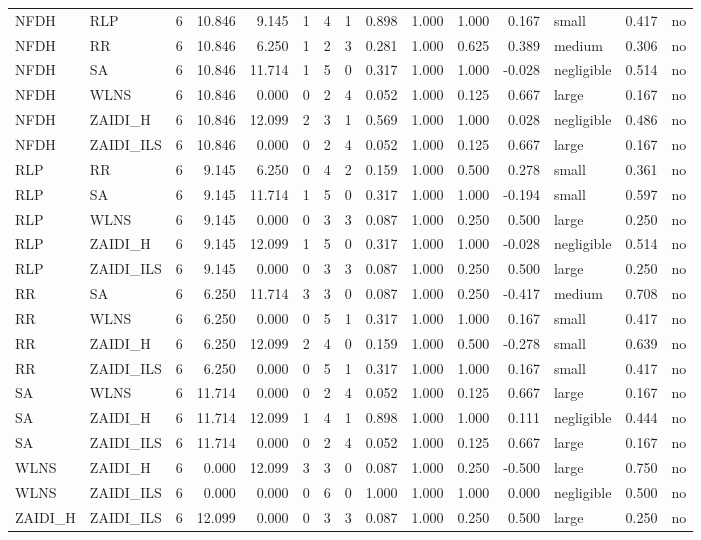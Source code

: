 \begin{table}[htbp]
\begin{tabular}{llrrrrrrrrrrlrr}
NFDH & RLP & 6 & 10.846 & 9.145 & 1 & 4 & 1 & 0.898 & 1.000 & 1.000 & 0.167 & small & 0.417 & no \\
NFDH & RR & 6 & 10.846 & 6.250 & 1 & 2 & 3 & 0.281 & 1.000 & 0.625 & 0.389 & medium & 0.306 & no \\
NFDH & SA & 6 & 10.846 & 11.714 & 1 & 5 & 0 & 0.317 & 1.000 & 1.000 & -0.028 & negligible & 0.514 & no \\
NFDH & WLNS & 6 & 10.846 & 0.000 & 0 & 2 & 4 & 0.052 & 1.000 & 0.125 & 0.667 & large & 0.167 & no \\
NFDH & ZAIDI\_H & 6 & 10.846 & 12.099 & 2 & 3 & 1 & 0.569 & 1.000 & 1.000 & 0.028 & negligible & 0.486 & no \\
NFDH & ZAIDI\_ILS & 6 & 10.846 & 0.000 & 0 & 2 & 4 & 0.052 & 1.000 & 0.125 & 0.667 & large & 0.167 & no \\
RLP & RR & 6 & 9.145 & 6.250 & 0 & 4 & 2 & 0.159 & 1.000 & 0.500 & 0.278 & small & 0.361 & no \\
RLP & SA & 6 & 9.145 & 11.714 & 1 & 5 & 0 & 0.317 & 1.000 & 1.000 & -0.194 & small & 0.597 & no \\
RLP & WLNS & 6 & 9.145 & 0.000 & 0 & 3 & 3 & 0.087 & 1.000 & 0.250 & 0.500 & large & 0.250 & no \\
RLP & ZAIDI\_H & 6 & 9.145 & 12.099 & 1 & 5 & 0 & 0.317 & 1.000 & 1.000 & -0.028 & negligible & 0.514 & no \\
RLP & ZAIDI\_ILS & 6 & 9.145 & 0.000 & 0 & 3 & 3 & 0.087 & 1.000 & 0.250 & 0.500 & large & 0.250 & no \\
RR & SA & 6 & 6.250 & 11.714 & 3 & 3 & 0 & 0.087 & 1.000 & 0.250 & -0.417 & medium & 0.708 & no \\
RR & WLNS & 6 & 6.250 & 0.000 & 0 & 5 & 1 & 0.317 & 1.000 & 1.000 & 0.167 & small & 0.417 & no \\
RR & ZAIDI\_H & 6 & 6.250 & 12.099 & 2 & 4 & 0 & 0.159 & 1.000 & 0.500 & -0.278 & small & 0.639 & no \\
RR & ZAIDI\_ILS & 6 & 6.250 & 0.000 & 0 & 5 & 1 & 0.317 & 1.000 & 1.000 & 0.167 & small & 0.417 & no \\
SA & WLNS & 6 & 11.714 & 0.000 & 0 & 2 & 4 & 0.052 & 1.000 & 0.125 & 0.667 & large & 0.167 & no \\
SA & ZAIDI\_H & 6 & 11.714 & 12.099 & 1 & 4 & 1 & 0.898 & 1.000 & 1.000 & 0.111 & negligible & 0.444 & no \\
SA & ZAIDI\_ILS & 6 & 11.714 & 0.000 & 0 & 2 & 4 & 0.052 & 1.000 & 0.125 & 0.667 & large & 0.167 & no \\
WLNS & ZAIDI\_H & 6 & 0.000 & 12.099 & 3 & 3 & 0 & 0.087 & 1.000 & 0.250 & -0.500 & large & 0.750 & no \\
WLNS & ZAIDI\_ILS & 6 & 0.000 & 0.000 & 0 & 6 & 0 & 1.000 & 1.000 & 1.000 & 0.000 & negligible & 0.500 & no \\
ZAIDI\_H & ZAIDI\_ILS & 6 & 12.099 & 0.000 & 0 & 3 & 3 & 0.087 & 1.000 & 0.250 & 0.500 & large & 0.250 & no \\
\bottomrule
\end{tabular}
\end{table}
